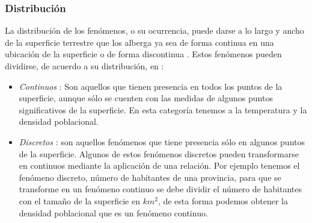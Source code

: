 \subsubsection{Distribución}
La distribución de los fenómenos, o su ocurrencia, puede darse a lo largo y ancho de la superficie
terrestre que los alberga ya sea de forma continua en una ubicación de la superficie o de forma
discontinua \citep{fomentoConceptos2010}. Estos fenómenos pueden dividirse, de acuerdo a su distribución, en :

\begin{itemize}
    \item \textit{Continuos} : Son aquellos que tienen presencia en todos los puntos de la superficie, aunque sólo se cuenten con las medidas de algunos puntos significativos de la superficie. En esta categoría tenemos a la temperatura y la densidad poblacional.

    \item \textit{Discretos} : son aquellos fenómenos que tiene presencia sólo en algunos puntos de la superficie. Algunos de estos fenómenos discretos pueden transformarse en continuos mediante la aplicación de una relación. Por ejemplo tenemos el fenómeno discreto, número de habitantes de una provincia, para que se transforme en un fenómeno continuo se debe dividir el número de habitantes con el tamaño de la superficie en $km^2$, de esta forma podemos obtener la densidad poblacional que es un fenómeno continuo.
\end{itemize}
